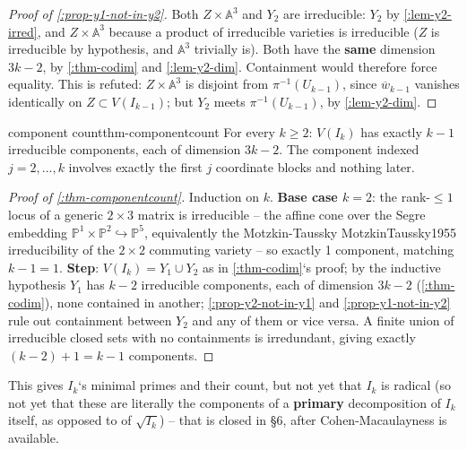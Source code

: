\documentclass[a4paper,11pt]{scrartcl}
\begin{document}
\begin{proof}[Proof of \cref{:prop-y1-not-in-y2}] Both \(Z \times \mathbb{A}^{3}\) and \(Y_{2}\) are irreducible: \(Y_{2}\) by \cref{:lem-y2-irred}, and \(Z \times \mathbb{A}^{3}\) because a product of irreducible varieties is irreducible (\(Z\) is irreducible by hypothesis, and \(\mathbb{A}^{3}\) trivially is). Both have the \textbf{same} dimension \(3k - 2\), by \cref{:thm-codim} and \cref{:lem-y2-dim}. Containment would therefore force equality. This is refuted: \(Z \times \mathbb{A}^{3}\) is disjoint from \(\pi^{- 1}\left( U_{k - 1} \right)\), since \({\overline{w}}_{k - 1}\) vanishes identically on \(Z \subset V\left( I_{k - 1} \right)\); but \(Y_{2}\) meets \(\pi^{- 1}\left( U_{k - 1} \right)\), by \cref{:lem-y2-dim}.

\end{proof}

\begin{theorem}{component count}{thm-componentcount} For every \(k \geq 2\): \(V\left( I_{k} \right)\) has exactly \(k - 1\) irreducible components, each of dimension \(3k - 2\). The component indexed \(j = 2,\ldots,k\) involves exactly the first \(j\) coordinate blocks and nothing later.

\end{theorem} \protect{}\label{thm-componentcount}{}

\begin{proof}[Proof of \cref{:thm-componentcount}] Induction on \(k\). \textbf{Base case \(k = 2\)}: the rank-\(\leq 1\) locus of a generic \(2 \times 3\) matrix is irreducible -- the affine cone over the Segre embedding \(\mathbb{P}^{1} \times \mathbb{P}^{2} \hookrightarrow \mathbb{P}^{5}\), equivalently the Motzkin-Taussky MotzkinTaussky1955 irreducibility of the \(2 \times 2\) commuting variety -- so exactly 1 component, matching \(k - 1 = 1\). \textbf{Step}: \(V\left( I_{k} \right) = Y_{1} \cup Y_{2}\) as in \cref{:thm-codim}`s proof; by the inductive hypothesis \(Y_{1}\) has \(k - 2\) irreducible components, each of dimension \(3k - 2\) (\cref{:thm-codim}), none contained in another; \cref{:prop-y2-not-in-y1} and \cref{:prop-y1-not-in-y2} rule out containment between \(Y_{2}\) and any of them or vice versa. A finite union of irreducible closed sets with no containments is irredundant, giving exactly \((k - 2) + 1 = k - 1\) components.

\end{proof}

This gives \(I_{k}\)`s minimal primes and their count, but not yet that \(I_{k}\) is radical (so not yet that these are literally the components of a \textbf{primary} decomposition of \(I_{k}\) itself, as opposed to of \(\sqrt{I_{k}}\)) -- that is closed in §6, after Cohen-Macaulayness is available.
\end{document}
